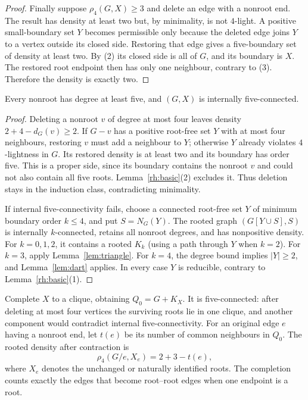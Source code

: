 \begin{proof}
Finally suppose $\rho_4(G,X)\ge3$ and delete an edge with a nonroot
end. The result has density at least two but, by minimality, is not
$4$-light. A positive small-boundary set $Y$ becomes permissible only
because the deleted edge joins $Y$ to a vertex outside its closed
side. Restoring that edge gives a five-boundary set of density at least
two. By (2) its closed side is all of $G$, and its boundary is $X$.
The restored root endpoint then has only one neighbour, contrary to
(3). Therefore the density is exactly two.
\end{proof}

\begin{lemma}\label{rh:internal}
Every nonroot has degree at least five, and $(G,X)$ is internally
five-connected.
\end{lemma}

\begin{proof}
Deleting a nonroot $v$ of degree at most four leaves density
$2+4-d_G(v)\ge2$. If $G-v$ has a positive root-free set $Y$ with at
most four neighbours, restoring $v$ must add a neighbour to $Y$;
otherwise $Y$ already violates $4$-lightness in $G$. Its restored
density is at least two and its boundary has order five. This is a
proper side, since its boundary contains the nonroot $v$ and could not
also contain all five roots. Lemma~\ref{rh:basic}(2) excludes it.
Thus deletion stays in the induction class, contradicting minimality.

If internal five-connectivity fails, choose a connected root-free set
$Y$ of minimum boundary order $k\le4$, and put $S=N_G(Y)$. The rooted
graph $(G[Y\cup S],S)$ is internally $k$-connected, retains all nonroot
degrees, and has nonpositive density. For $k=0,1,2$, it contains a rooted
$K_k$ (using a path through $Y$ when $k=2$). For $k=3$, apply
Lemma~\ref{lem:triangle}. For $k=4$, the degree bound implies $|Y|\ge2$,
and Lemma~\ref{lem:dart} applies. In every case $Y$ is reducible,
contrary to Lemma~\ref{rh:basic}(1).
\end{proof}

Complete $X$ to a clique, obtaining $Q_0=G+K_X$. It is five-connected:
after deleting at most four vertices the surviving roots lie in one
clique, and another component would contradict internal five-connectivity.
For an original edge $e$ having a nonroot end, let $t(e)$ be its number
of common neighbours in $Q_0$. The rooted density after contraction is
\begin{equation}\label{rh:contract-density}
 \rho_4(G/e,X_e)=2+3-t(e),
\end{equation}
where $X_e$ denotes the unchanged or naturally identified roots. The
completion counts exactly the edges that become root--root edges when
one endpoint is a root.

